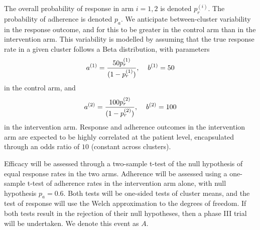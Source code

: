 \documentclass{article} %
\begin{document}
The overall probability of response in arm $i=1,2$ is denoted $p_{r}^{(i)}$. The probability of adherence is denoted $p_{a}$. We anticipate between-cluster variability in the response outcome, and for this to be greater in the control arm than in the intervention arm. This variability is modelled by assuming that the true response rate in a given cluster follows a Beta distribution, with parameters
\begin{equation}
a^{(1)} = \frac{50 p_{r}^{(1)}}{(1-p_{r}^{(1)})}, \hspace{4mm} b^{(1)} = 50
\end{equation}
in the control arm, and
\begin{equation}
a^{(2)} = \frac{100 p_{r}^{(2)}}{(1-p_{r}^{(2)})}, \hspace{4mm} b^{(2)} = 100
\end{equation}
in the intervention arm. Response and adherence outcomes in the intervention arm are expected to be highly correlated at the patient level, encapsulated through an odds ratio of $10$ (constant across clusters).

Efficacy will be assessed through a two-sample t-test of the null hypothesis of equal response rates in the two arms. Adherence will be assessed using a one-sample t-test of adherence rates in the intervention arm alone, with null hypothesis $p_{a} = 0.6$. Both tests will be one-sided tests of cluster means, and the test of response will use the Welch approximation to the degrees of freedom. If both tests result in the rejection of their null hypotheses, then a phase III trial will be undertaken. We denote this event as $A$.
\end{document}
